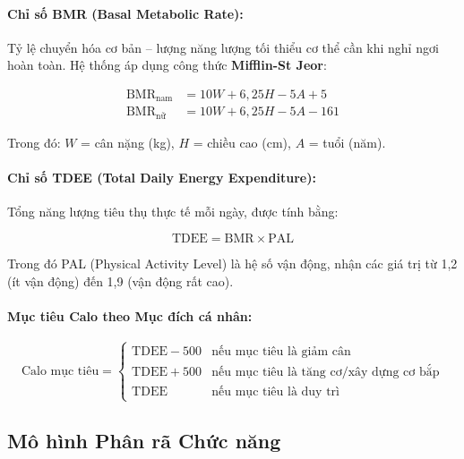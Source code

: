 \documentclass[12pt,a4paper]{article}
\begin{document}
\paragraph{Chỉ số BMR (Basal Metabolic Rate):}
Tỷ lệ chuyển hóa cơ bản -- lượng năng lượng tối thiểu cơ thể cần khi nghỉ ngơi hoàn toàn. Hệ thống áp dụng công thức \textbf{Mifflin-St Jeor}:

\begin{align}
    \text{BMR}_{\text{nam}} &= 10W + 6{,}25H - 5A + 5 \\
    \text{BMR}_{\text{nữ}} &= 10W + 6{,}25H - 5A - 161
\end{align}

Trong đó: $W$ = cân nặng (kg), $H$ = chiều cao (cm), $A$ = tuổi (năm).

\paragraph{Chỉ số TDEE (Total Daily Energy Expenditure):}
Tổng năng lượng tiêu thụ thực tế mỗi ngày, được tính bằng:

\begin{equation}
    \text{TDEE} = \text{BMR} \times \text{PAL}
\end{equation}

Trong đó PAL (Physical Activity Level) là hệ số vận động, nhận các giá trị từ 1,2 (ít vận động) đến 1,9 (vận động rất cao).

\paragraph{Mục tiêu Calo theo Mục đích cá nhân:}

\begin{equation}
    \text{Calo mục tiêu} = 
    \begin{cases}
        \text{TDEE} - 500 & \text{nếu mục tiêu là giảm cân} \\
        \text{TDEE} + 500 & \text{nếu mục tiêu là tăng cơ/xây dựng cơ bắp} \\
        \text{TDEE}       & \text{nếu mục tiêu là duy trì}
    \end{cases}
\end{equation}

\subsection{Mô hình Phân rã Chức năng}
\end{document}
